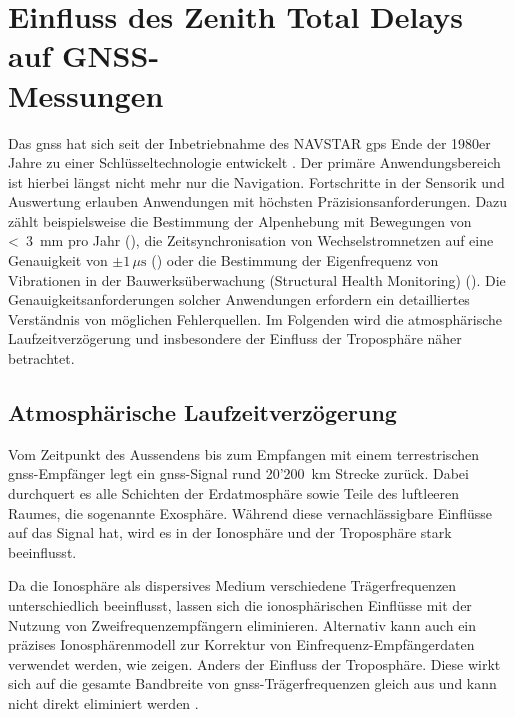 \clearpage
\section[Einfluss des Zenith Total Delays auf GNSS-Messungen]{Einfluss des Zenith Total Delays auf GNSS-\\Messungen}
\label{sec:literaturrecherche}
Das \gls{gnss} hat sich seit der Inbetriebnahme des NAVSTAR \gls{gps} Ende der 
1980er Jahre zu einer Schlüsseltechnologie entwickelt \parencite[S. 3]{dodelGPSNAVSTAR2009}. Der primäre 
Anwendungsbereich ist hierbei längst nicht mehr nur die Navigation. Fortschritte in der Sensorik und 
Auswertung erlauben Anwendungen mit höchsten Präzisionsanforderungen. Dazu zählt beispielsweise die 
Bestimmung der Alpenhebung mit Bewegungen von <~3~mm pro Jahr (\cite{serpelloniSurfaceVelocitiesStrainRates2022}), 
die Zeitsynchronisation von Wechselstromnetzen auf eine Genauigkeit von $\pm 1\,\mu\mathrm{s}$ 
(\cite{crossleyTimeSynchronizationTransmission2016}) oder die Bestimmung der Eigenfrequenz von Vibrationen in der Bauwerksüberwachung 
(Structural Health Monitoring) (\cite{yuPerformanceAssessmentHighrate2022}). Die Genauigkeitsanforderungen solcher Anwendungen 
erfordern ein detailliertes Verständnis von möglichen Fehlerquellen. Im Folgenden wird die atmosphärische 
Laufzeitverzögerung und insbesondere der Einfluss der Troposphäre näher betrachtet.


\subsection{Atmosphärische Laufzeitverzögerung}
Vom Zeitpunkt des Aussendens bis zum Empfangen mit einem terrestrischen \acrshort{gnss}-Empfänger legt ein \acrshort{gnss}-Signal 
rund 20'200~km Strecke zurück. Dabei durchquert es alle Schichten der Erdatmosphäre 
sowie Teile des luftleeren Raumes, die sogenannte Exosphäre. Während diese vernachlässigbare Einflüsse auf 
das Signal hat, wird es in der Ionosphäre und der Troposphäre stark beeinflusst. \parencite[S. 148]{dodelGPSNAVSTAR2009}

Da die Ionosphäre als dispersives Medium verschiedene Trägerfrequenzen unterschiedlich beeinflusst, 
lassen sich die ionosphärischen Einflüsse mit der Nutzung von Zweifrequenzempfängern eliminieren. Alternativ 
kann auch ein präzises Ionosphärenmodell zur Korrektur von Einfrequenz-Empfängerdaten verwendet werden, wie 
\cite{boisitsRegiomontanRegionalHigh2020} zeigen. Anders der Einfluss der Troposphäre. Diese wirkt sich auf die gesamte 
Bandbreite von \acrshort{gnss}-Trägerfrequenzen gleich aus und kann nicht direkt eliminiert werden 
\parencite[S. 56]{seeberSatelliteGeodesy2003}. 

